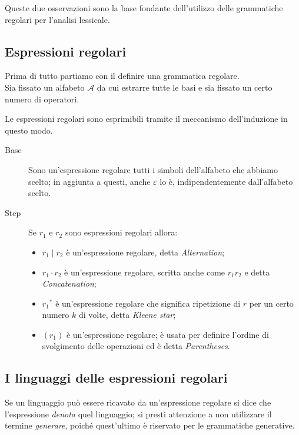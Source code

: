 \documentclass[class=book, crop=false, oneside, 12pt]{standalone}
\begin{document}
Queste due osservazioni sono la base fondante dell'utilizzo delle grammatiche regolari per l’analisi lessicale.

\subsection{Espressioni regolari}
Prima di tutto partiamo con il definire una grammatica regolare.\\
Sia fissato un alfabeto \(\mathcal{A}\) da cui estrarre tutte le basi e sia fissato un certo numero di operatori.

Le espressioni regolari sono esprimibili tramite il meccanismo dell'induzione in questo modo.
\begin{description}
    \item[Base] Sono un'espressione regolare tutti i simboli dell’alfabeto che abbiamo scelto; in aggiunta a questi, anche \(\varepsilon\) lo è, indipendentemente dall'alfabeto scelto.
    \item[Step] Se \(r_1\) e \(r_2\) sono espressioni regolari allora:
    \begin{itemize}
        \item \(r_1 \mid r_2\) è un’espressione regolare, detta \emph{Alternation};
        \item \(r_1 \cdot r_2\) è un’espressione regolare, scritta anche come \(r_1 r_2\) e detta \emph{Concatenation};
        \item \(r_1\)\(^\ast\) è un’espressione regolare che significa ripetizione di \(r\) per un certo numero \(k\) di volte, detta \emph{Kleene star};
        \item \((r_1)\) è un’espressione regolare; è usata per definire l’ordine di svolgimento delle operazioni ed è detta \emph{Parentheses}.
    \end{itemize} 
\end{description}

\subsection{I linguaggi delle espressioni regolari}
Se un linguaggio può essere ricavato da un'espressione regolare si dice che l'espressione \emph{denota} quel linguaggio; si presti attenzione a non utilizzare il termine \emph{generare}, poiché quest'ultimo è riservato per le grammatiche generative.
\end{document}
